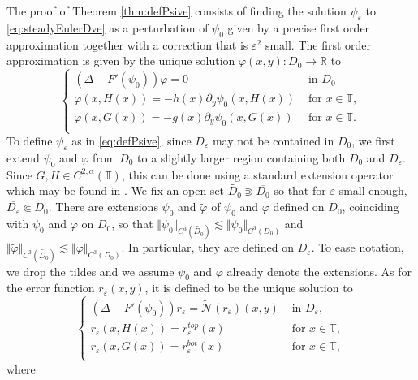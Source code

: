\documentclass[11pt,reqno]{amsproc}
\newcommand{\R}{\mathbb{R}}
\newcommand{\N}{\mathcal{N}}
\newcommand{\ve}{\varepsilon}
\numberwithin{equation}{section}
\numberwithin{theorem}{section}
\numberwithin{prop}{section}
\numberwithin{cor}{section}
\numberwithin{lemma}{section}
\theoremstyle{remark}
\theoremstyle{definition}
\begin{document}
The proof of Theorem \ref{thm:defPsive} consists of finding the solution $\psi_\ve$ to \eqref{eq:steadyEulerDve} as a perturbation of $\psi_0$ given by a precise first order approximation together with a correction that is $\ve^2$ small. The first order approximation is given by the unique solution $\varphi(x,y):D_0\rightarrow \R$ to
\begin{equation}\label{eq:HGvarphi}
\begin{cases}
\left(\Delta-F'(\psi_0)\right)\varphi = 0 & \text{ in } D_0 \\
\varphi(x,H(x))= -h(x)\partial_y\psi_0(x,H(x)) & \text{ for } x\in \mathbb{T}, \\
\varphi(x,G(x))= -g(x)\partial_y\psi_0(x,G(x)) & \text{ for } x\in\mathbb{T}. \\
\end{cases}
\end{equation} 
To define $\psi_\ve$ as in \eqref{eq:defPsive}, since $D_\ve$ may not be contained in $D_0$,
we first extend $\psi_0$ and $\varphi$ 
from $D_0$ to a slightly larger region containing both $D_0$ and $D_\ve$.  Since $G,H\in C^{2,\alpha}(\mathbb{T})$, this can be done using a standard extension operator which may be found in \cite[Lemma 6.37]{gilbargtrudinger}. We fix an open set $\widetilde{D_0} \Supset \overline{D_0}$ so that for $\ve$ small enough,
$\overline{D_\ve} \Subset {\widetilde{D}_0}$. There are 
extensions $\widetilde{\psi}_0$ and $\widetilde{\varphi}$ of $\psi_0$ and $\varphi$ defined on
$\widetilde{D}_0$, coinciding with $\psi_0$ and $\varphi$ on $D_0$, so that  $\Vert\widetilde{\psi}_0\Vert_{C^3(\widetilde{D_0})}\lesssim \Vert \psi_0 \Vert_{C^3(D_0)}$ and $\Vert \widetilde{\varphi}\Vert_{C^3(\widetilde{D_0})} \lesssim \Vert \varphi \Vert_{C^3(D_0)}$. In particular, they are defined on $D_\ve$. To ease notation, we drop the tildes and we assume $\psi_0$ and $\varphi$ already denote the extensions. As for the error function $r_\ve(x,y)$, it is defined to be the unique solution to
\begin{equation}\label{eq:rve}
\begin{cases}
\left(\Delta-F'(\psi_0)\right)r_\ve = \widetilde{\N}(r_\ve)(x,y) & \text{ in } D_\ve, \\
r_\ve(x,H(x))= r_\ve^{top}(x) & \text{ for } x\in \mathbb{T}, \\
r_\ve(x, G(x))= r_\ve^{bot}(x) & \text{ for } x\in\mathbb{T}, \\
\end{cases}
\end{equation}
where
\end{document}
